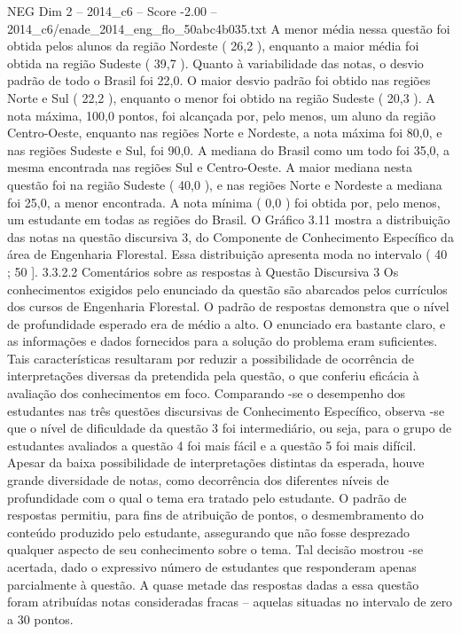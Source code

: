 \begin{textsample}{NEG Dim 2 – 2014\_c6 – Score -2.00 – 2014\_c6/enade\_2014\_eng\_flo\_50abc4b035.txt}
A menor média nessa questão foi obtida pelos alunos da região Nordeste ( 26,2 ), enquanto a maior média foi obtida na região Sudeste ( 39,7 ).
Quanto à variabilidade das notas, o desvio padrão de todo o Brasil foi 22,0.
O maior desvio padrão foi obtido nas regiões Norte e Sul ( 22,2 ), enquanto o menor foi obtido na região Sudeste ( 20,3 ).
A nota máxima, 100,0 pontos, foi alcançada por, pelo menos, um aluno da região Centro-Oeste, enquanto nas regiões Norte e Nordeste, a nota máxima foi 80,0, e nas regiões Sudeste e Sul, foi 90,0.
A mediana do Brasil como um todo foi 35,0, a mesma encontrada nas regiões Sul e Centro-Oeste.
A maior mediana nesta questão foi na região Sudeste ( 40,0 ), e nas regiões Norte e Nordeste a mediana foi 25,0, a menor encontrada.
A nota mínima ( 0,0 ) foi obtida por, pelo menos, um estudante em todas as regiões do Brasil.
O Gráfico 3.11 mostra a distribuição das notas na questão discursiva 3, do Componente de Conhecimento Específico da área de Engenharia Florestal.
Essa distribuição apresenta moda no intervalo ( 40 ; 50 ]. 3.3.2.2 Comentários sobre as respostas à Questão Discursiva 3 Os conhecimentos exigidos pelo enunciado da questão são abarcados pelos currículos dos cursos de Engenharia Florestal.
O padrão de respostas demonstra que o nível de profundidade esperado era de médio a alto.
O enunciado era bastante claro, e as informações e dados fornecidos para a solução do problema eram suficientes.
Tais características resultaram por reduzir a possibilidade de ocorrência de interpretações diversas da pretendida pela questão, o que conferiu eficácia à avaliação dos conhecimentos em foco.
Comparando -se o desempenho dos estudantes nas três questões discursivas de Conhecimento Específico, observa -se que o nível de dificuldade da questão 3 foi intermediário, ou seja, para o grupo de estudantes avaliados a questão 4 foi mais fácil e a questão 5 foi mais difícil.
Apesar da baixa possibilidade de interpretações distintas da esperada, houve grande diversidade de notas, como decorrência dos diferentes níveis de profundidade com o qual o tema era tratado pelo estudante.
O padrão de respostas permitiu, para fins de atribuição de pontos, o desmembramento do conteúdo produzido pelo estudante, assegurando que não fosse desprezado qualquer aspecto de seu conhecimento sobre o tema.
Tal decisão mostrou -se acertada, dado o expressivo número de estudantes que responderam apenas parcialmente à questão.
A quase metade das respostas dadas a essa questão foram atribuídas notas consideradas fracas – aquelas situadas no intervalo de zero a 30 pontos.

\end{textsample}
